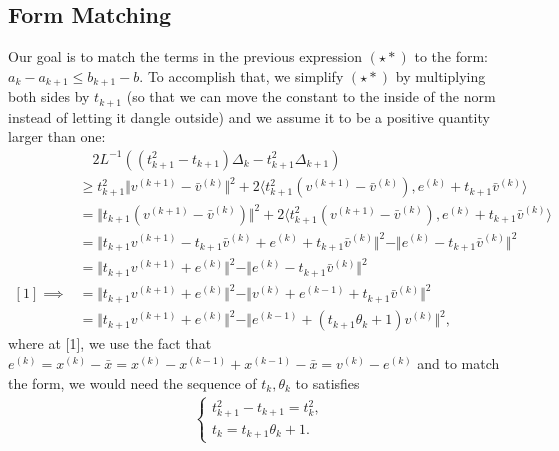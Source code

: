 \documentclass[]{article}
\theoremstyle{definition}
\begin{document}
    \subsection{Form Matching}
        Our goal is to match the terms in the previous expression $(\star*)$ to the form: $a_k - a_{k + 1}\le b_{k + 1} - b$. To accomplish that, we simplify $(\star*)$ by multiplying both sides by $t_{k + 1}$ (so that we can move the constant to the inside of the norm instead of letting it dangle outside) and we assume it to be a positive quantity larger than one: 
        \begin{align*}
            & \quad 2L^{-1}((t_{k + 1}^2 - t_{k + 1})\Delta_k - t_{k + 1}^2\Delta_{k + 1})
            \\
            & \ge  
            t_{k + 1}^2\Vert v^{(k + 1)} - \bar v^{(k)}\Vert^2 + 
            2\langle t_{k + 1}^2(v^{(k + 1)} - \bar v^{(k)}), e^{(k)} + t_{k + 1} \bar v^{(k)}\rangle
            \\
            &=
            \Vert t_{k + 1} (v^{(k + 1)} - \bar v^{(k)}) \Vert^2 + 
            2\langle t_{k + 1}^2(v^{(k + 1)} - \bar v^{(k)}), e^{(k)} + t_{k + 1}\bar v^{(k)}\rangle
            \\
            &=
            \Vert t_{k+1} v^{(k + 1)} - t_{k + 1}\bar v^{(k)} + e^{(k)} + t_{k + 1}\bar v^{(k)}\Vert^2
            - 
            \Vert e^{(k)} - t_{k + 1} \bar v^{(k)}\Vert^2
            \\
            &=
            \Vert 
                t_{k+1} v^{(k + 1)} + e^{(k)}
            \Vert^2
            - 
            \Vert e^{(k)} - t_{k + 1} \bar v^{(k)}\Vert^2
            \\
            [1]\implies
            & = 
            \Vert t_{k + 1}v^{(k + 1)} + e^{(k)}\Vert^2
            - 
            \Vert v^{(k)} + e^{(k - 1)} + t_{k + 1}\bar v^{(k)} \Vert^2
            \\
            & = 
            \Vert t_{k + 1}v^{(k + 1)} + e^{(k)}\Vert^2
            - 
            \Vert e^{(k - 1)} + (t_{k + 1}\theta_k + 1) v^{(k)} \Vert^2, 
            \tag{$\star \star$}
        \end{align*}
        where at [1], we use the fact that $e^{(k)}= x^{(k)} - \bar x = x^{(k)} - x^{(k - 1)}+ x^{(k - 1)} - \bar x = v^{(k)} - e^{(k)}$ and to match the form, we would need the sequence of $t_k, \theta_k$ to satisfies
        \begin{align*}
            \begin{cases}
                t^2_{k + 1} - t_{k + 1} = t_k^2,
                \\
                t_k = t_{k + 1}\theta_k + 1. 
            \end{cases}
            \tag{$\star **$}
        \end{align*}
\end{document}
